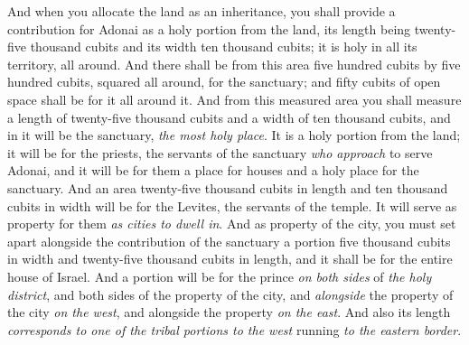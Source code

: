 \begin{biblechapter} %
 And when you allocate the land as an inheritance, you shall provide a contribution for Adonai as a holy portion from the land, its length being twenty-five thousand cubits and its width ten thousand cubits; it is holy in all its territory, all around.
\verse And there shall be from this area five hundred cubits by five hundred cubits, squared all around, for the sanctuary; and fifty cubits﻿ of open space shall be for it all around it.
\verse And from this measured area you shall measure a length of twenty-five thousand cubits and a width of ten thousand cubits, and in it will be the sanctuary, \textit{the most holy place}.
\verse It is a holy portion from the land; it will be for the priests, the servants of the sanctuary \textit{who approach} to serve Adonai, and it will be for them a place for houses and a holy place for the sanctuary.
\verse And an area twenty-five thousand cubits in length and ten thousand cubits in width will be for the Levites, the servants of the temple. It will serve as property for them \textit{as cities to dwell in}.
\verse And as property of the city, you must set apart alongside the contribution of the sanctuary a portion five thousand cubits in width and twenty-five thousand cubits in length, and it shall be for the entire house of Israel.
\verse And a portion will be for the prince \textit{on both sides} of \textit{the holy district}, and both sides of the property of the city, and \textit{alongside} the property of the city \textit{on the west}, and alongside the property \textit{on the east}. And also its length \textit{corresponds to one of the tribal portions to the west} running \textit{to the eastern border}.

\end{biblechapter}
